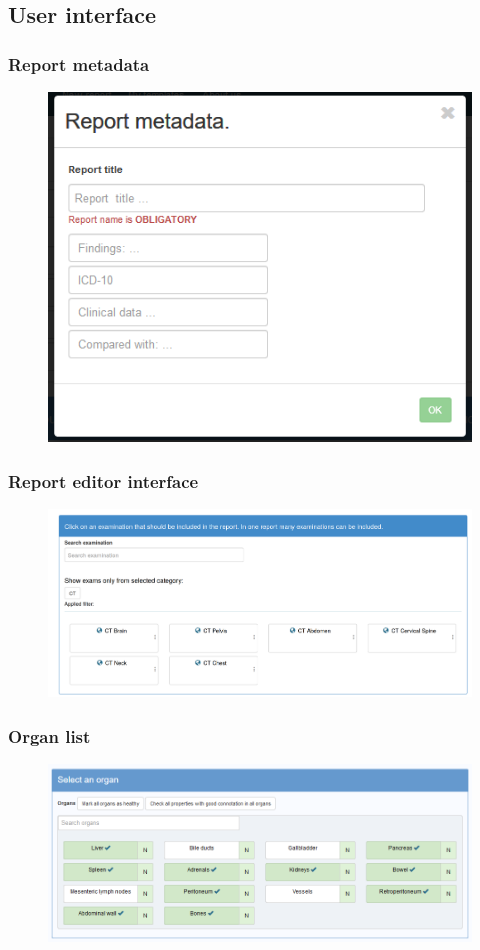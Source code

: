 \documentclass{beamer}
\begin{document}
\subsection{User interface}
\begin{frame}
\frametitle{Report metadata}
\begin{figure}
	\centering
	\includegraphics[width=0.6\linewidth]{../report-metadata}
	\label{fig:report-metadata}
\end{figure}
\end{frame}

\begin{frame}
\frametitle{Report editor interface}
\begin{figure}
	\centering
	\includegraphics[width=1\linewidth]{../examination-list}
	\label{fig:examination-list}
\end{figure}
\end{frame}

\begin{frame}
\frametitle{Organ list}
\begin{figure}
	\centering
	\includegraphics[width=1\linewidth]{../report-organs}
	\label{fig:organ-list}
\end{figure}
\end{frame}
\end{document}

